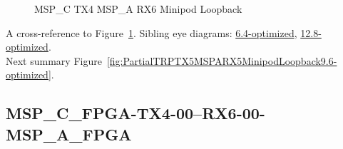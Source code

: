 \begin{figure}[h]
\begin{subfigure}{0.33\textwidth}
\hyperref[sec:MSPCFPGATX406RX606MSPAFPGA9.6-optimized]{}
\end{subfigure}\hspace*{\fill}
\begin{subfigure}{0.33\textwidth}
\hyperref[sec:MSPCFPGATX407RX607MSPAFPGA9.6-optimized]{}
\end{subfigure}\hspace*{\fill}
\begin{subfigure}{0.33\textwidth}
\hyperref[sec:MSPCFPGATX408RX608MSPAFPGA9.6-optimized]{}
\end{subfigure}

\begin{subfigure}{0.33\textwidth}
\hyperref[sec:MSPCFPGATX409RX609MSPAFPGA9.6-optimized]{}
\end{subfigure}\hspace*{\fill}
\begin{subfigure}{0.33\textwidth}
\hyperref[sec:MSPCFPGATX410RX610MSPAFPGA9.6-optimized]{}
\end{subfigure}\hspace*{\fill}
\begin{subfigure}{0.33\textwidth}
\hyperref[sec:MSPCFPGATX411RX611MSPAFPGA9.6-optimized]{}
\end{subfigure}

\caption{MSP\_C TX4 MSP\_A RX6 Minipod Loopback} \label{fig:MSPCTX4MSPARX6MinipodLoopback9.6-optimized}
\end{figure}

A cross-reference to Figure~\ref{fig:MSPCTX4MSPARX6MinipodLoopback9.6-optimized}.
Sibling eye diagrams: \hyperref[sec:MSPCTX4MSPARX6MinipodLoopback6.4-optimized]{6.4-optimized}, \hyperref[sec:MSPCTX4MSPARX6MinipodLoopback12.8-optimized]{12.8-optimized}. \\
Next summary Figure~\ref{fig:PartialTRPTX5MSPARX5MinipodLoopback9.6-optimized}.
\clearpage
% 
\subsection{MSP\_C\_FPGA-TX4-00--RX6-00-MSP\_A\_FPGA}\label{sec:MSPCFPGATX400RX600MSPAFPGA9.6-optimized}

